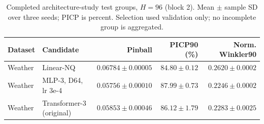\begin{table}[t]
\centering\small
\caption{Completed architecture-study test groups, $H=96$ (block 2). Mean $\pm$ sample SD over three seeds; PICP is percent. Selection used validation only; no incomplete group is aggregated.}
\label{tab:architecture-test-96-1}
\begin{tabular}{@{}llrrr@{}}
\toprule
Dataset & Candidate & Pinball & PICP90 (\%) & Norm. Winkler90 \\
\midrule
Weather & Linear-NQ & $0.06784\pm0.00005$ & $84.80\pm0.12$ & $0.2620\pm0.0002$ \\
Weather & MLP-3, D64, lr 3e-4 & $0.05756\pm0.00010$ & $87.99\pm0.73$ & $0.2246\pm0.0002$ \\
Weather & Transformer-3 (original) & $0.05853\pm0.00046$ & $86.12\pm1.79$ & $0.2283\pm0.0025$ \\
\bottomrule
\end{tabular}
\end{table}


